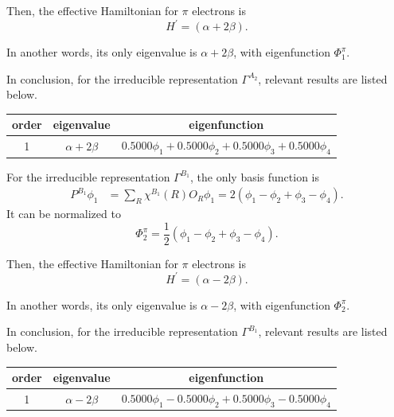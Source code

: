 		Then, the effective Hamiltonian for $\pi$ electrons is
		\begin{equation*}
			H^\prime = ( \alpha + 2\beta ).		
		\end{equation*}
		
		In another words, its only eigenvalue is $\alpha + 2\beta$, with eigenfunction $\Phi^\pi_1$.
		
		In conclusion, for the irreducible representation $\Gamma^{A_2}$, relevant results are listed below.
		
		\begin{center}
		\setlength{\abovecaptionskip}{0em}
		\begin{tabular}{ccc}\hline
		  order	&	eigenvalue		& 	eigenfunction	\\ \hline
			1	&$\alpha+2\beta$& 	$0.5000\phi_1 + 0.5000 \phi_2 + 0.5000 \phi_3 + 0.5000 \phi_4$ \\ \hline
		\end{tabular}
		\end{center}
		
		For the irreducible representation $\Gamma^{B_1}$, the only basis function is
		\begin{align*}
			P^{B_1}\phi_1 &= \sum_{R} \chi^{B_1}(R) O_R \phi_1 = 2(\phi_1 - \phi_2 + \phi_3 - \phi_4).
		\end{align*}
		It can be normalized to
		\begin{equation}
			\Phi^\pi_2 = \frac{1}{2}(\phi_1 - \phi_2 + \phi_3 -\phi_4).
		\end{equation}
		
		Then, the effective Hamiltonian for $\pi$ electrons is
		\begin{equation*}
			H^\prime = ( \alpha - 2\beta ).		
		\end{equation*}
		
		In another words, its only eigenvalue is $\alpha - 2\beta$, with eigenfunction $\Phi^\pi_2$.
		
		In conclusion, for the irreducible representation $\Gamma^{B_1}$, relevant results are listed below.
		
		\begin{center}
		\setlength{\abovecaptionskip}{0em}
		\begin{tabular}{ccc}\hline
		  order	&	eigenvalue		& 	eigenfunction	\\ \hline
			1	&$\alpha-2\beta$& 	$0.5000\phi_1 - 0.5000 \phi_2 + 0.5000 \phi_3 - 0.5000 \phi_4$ \\ \hline
		\end{tabular}
		\end{center}
		
